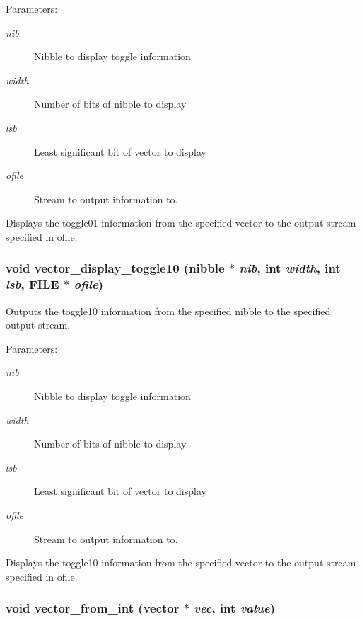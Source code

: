 \begin{Desc}
\item[Parameters:]
\begin{description}
\item[{\em nib}]Nibble to display toggle information \item[{\em width}]Number of bits of nibble to display \item[{\em lsb}]Least significant bit of vector to display \item[{\em ofile}]Stream to output information to.\end{description}
\end{Desc}
Displays the toggle01 information from the specified vector to the output stream specified in ofile. 
\subsubsection{\setlength{\rightskip}{0pt plus 5cm}void vector\_\-display\_\-toggle10 ({\bf nibble} $\ast$ {\em nib}, int {\em width}, int {\em lsb}, FILE $\ast$ {\em ofile})}\label{vector_8c_a15}


Outputs the toggle10 information from the specified nibble to the specified output stream. 

\begin{Desc}
\item[Parameters:]
\begin{description}
\item[{\em nib}]Nibble to display toggle information \item[{\em width}]Number of bits of nibble to display \item[{\em lsb}]Least significant bit of vector to display \item[{\em ofile}]Stream to output information to.\end{description}
\end{Desc}
Displays the toggle10 information from the specified vector to the output stream specified in ofile. 
\subsubsection{\setlength{\rightskip}{0pt plus 5cm}void vector\_\-from\_\-int ({\bf vector} $\ast$ {\em vec}, int {\em value})}\label{vector_8c_a31}


